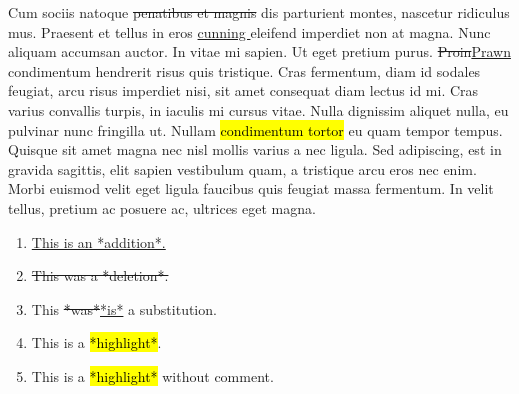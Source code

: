Cum sociis natoque
\st{penatibus et magnis} dis
parturient montes, nascetur ridiculus mus. Praesent et tellus in eros
\underline{cunning }eleifend
imperdiet non at magna. Nunc aliquam accumsan auctor. In vitae mi
sapien. Ut eget pretium purus.
\st{Proin}\underline{Prawn}
condimentum hendrerit risus quis tristique. Cras fermentum, diam id
sodales feugiat, arcu risus imperdiet nisi, sit amet consequat diam
lectus id mi. Cras varius convallis turpis, in iaculis mi cursus vitae.
Nulla dignissim aliquet nulla, eu pulvinar nunc fringilla ut. Nullam
\hl{condimentum tortor} eu quam tempor tempus. Quisque
sit amet magna nec nisl mollis varius a nec ligula. Sed adipiscing, est
in gravida sagittis, elit sapien vestibulum quam, a
tristique arcu eros nec enim. Morbi euismod
velit eget ligula faucibus quis feugiat massa fermentum. In velit
tellus, pretium ac posuere ac, ultrices eget magna.

\begin{enumerate}
\def\labelenumi{\arabic{enumi}.}
\tightlist
\item
  \underline{This is an *addition*.}
\item
  \st{This was a *deletion*.}
\item
  This \st{*was*}\underline{*is*} a substitution.
\item
  This is a
  \hl{*highlight*}.
\item
  This is a \hl{*highlight*} without comment.
\end{enumerate}

